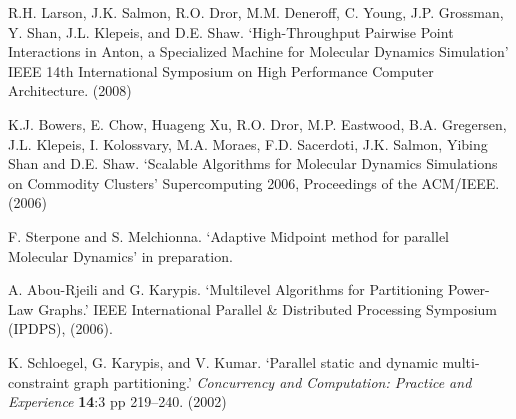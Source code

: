 \documentclass[paper=a4, fontsize=11pt,bibtotoc]{scrartcl}		%
\begin{document}
\begin{thebibliography}{1}
{R.H. Larson, J.K. Salmon, R.O. Dror, M.M. Deneroff, C. Young,
                      J.P. Grossman, Y. Shan, J.L. Klepeis, and D.E. Shaw.
`High-Throughput Pairwise Point Interactions in Anton,
a Specialized Machine for Molecular Dynamics Simulation'
IEEE 14th International Symposium on High Performance Computer Architecture.  (2008)}

{ K.J. Bowers, E. Chow, Huageng Xu, R.O. Dror, M.P. Eastwood, B.A. Gregersen, J.L. Klepeis, I. Kolossvary, M.A. Moraes, F.D. Sacerdoti, J.K. Salmon, 
Yibing Shan and D.E. Shaw. 
`Scalable Algorithms for Molecular Dynamics Simulations on Commodity Clusters'
Supercomputing 2006, Proceedings of the ACM/IEEE.  (2006)}

{ F. Sterpone and S. Melchionna.
`Adaptive Midpoint method for parallel Molecular Dynamics'
in preparation.}

{A. Abou-Rjeili and G. Karypis. `Multilevel Algorithms for Partitioning Power-Law Graphs.'    
IEEE International Parallel \& Distributed Processing Symposium (IPDPS), (2006).}
        
{K. Schloegel, G. Karypis, and V. Kumar.  `Parallel static and dynamic multi-constraint graph partitioning.'
\textsl{Concurrency and Computation: Practice and Experience} \textbf{14}:3 pp 219--240.  (2002)}
        
\end{thebibliography}                      
\end{document}
